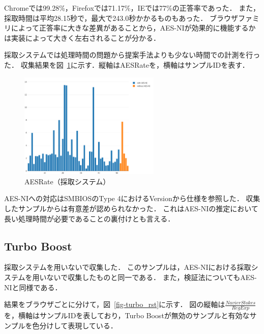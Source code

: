 Chromeでは99.28\%，Firefoxでは71.17\%，IEでは77\%の正答率であった．
また，採取時間は平均28.15秒で，最大で243.0秒かかるものもあった．
ブラウザファミリによって正答率に大きな差異があることから，AES-NIが効果的に機能するかは実装によって大きく左右されることが分かる．

採取システムでは処理時間の問題から提案手法よりも少ない時間での計測を行った．
収集結果を図~\ref{fig-aes_rst_sys}に示す．縦軸はAESRateを，横軸はサンプルIDを表す．

\begin{figure}[H]
    \centering
    \includegraphics[width=0.6\textwidth,pagebox=cropbox]{fig/aes_rst.pdf}
    \caption{AESRate（採取システム）}
    \label{fig-aes_rst_sys}
\end{figure}

AES-NIへの対応はSMBIOSのType 4におけるVersionから仕様を参照した．
収集したサンプルからは有意差が認められなかった．
これはAES-NIの推定において長い処理時間が必要であることの裏付けとも言える．

\subsection{Turbo Boost}
採取システムを用いないで収集した．
このサンプルは，AES-NIにおける採取システムを用いないで収集したものと同一である．
また，検証法についてもAES-NIと同様である．

結果をブラウザごとに分けて，図~\ref{fig-turbo_rst}に示す．
図の縦軸は$\frac{NavierStokes}{RegExp}$を，横軸はサンプルIDを表しており，Turbo Boostが無効のサンプルと有効なサンプルを色分けして表現している．

